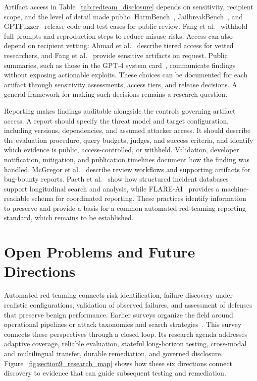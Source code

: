 \documentclass[review]{fcs}
\let\fcsOriginalCite\cite
\renewcommand{\cite}[1]{\allowbreak\fcsOriginalCite{#1}}
\begin{document}
Artifact access in Table~\ref{tab:redteam_disclosure} depends on sensitivity, recipient scope, and the level of detail made public. HarmBench~\cite{mazeika2024harmbench}, JailbreakBench~\cite{chao2024jailbreakbench}, and GPTFuzzer~\cite{yu2023gptfuzzer} release code and test cases for public review. Fang et al.~\cite{fang2024llmagentsautonomouslyhack} withhold full prompts and reproduction steps to reduce misuse risks. Access can also depend on recipient vetting: Ahmad et al.~\cite{ahmad2025externalredteaming} describe tiered access for vetted researchers, and Fang et al.~\cite{fang2024llmagentsautonomouslyhack} provide sensitive artifacts on request. Public summaries, such as those in the GPT-4 system card~\cite{openai2023gpt4systemcard}, communicate findings without exposing actionable exploits. These choices can be documented for each artifact through sensitivity assessments, access tiers, and release decisions. A general framework for making such decisions remains a research question.

Reporting makes findings auditable alongside the controls governing artifact access. A report should specify the threat model and target configuration, including versions, dependencies, and assumed attacker access. It should describe the evaluation procedure, query budgets, judges, and success criteria, and identify which evidence is public, access-controlled, or withheld. Validation, developer notification, mitigation, and publication timelines document how the finding was handled. McGregor et al.~\cite{mcgregor2025toerr} describe review workflows and supporting artifacts for bug-bounty reports. Paeth et al.~\cite{paeth2025lessons} show how structured incident databases support longitudinal search and analysis, while FLARE-AI~\cite{longpre2026flareai} provides a machine-readable schema for coordinated reporting. These practices identify information to preserve and provide a basis for a common automated red-teaming reporting standard, which remains to be established.

\section{Open Problems and Future Directions}
\label{sec:agenda}

Automated red teaming connects risk identification, failure discovery under realistic configurations, validation of observed failures, and assessment of defenses that preserve benign performance. Earlier surveys organize the field around operational pipelines or attack taxonomies and search strategies~\cite{purpura-etal-2025-building,Lin_2025}. This survey connects these perspectives through a closed loop. Its research agenda addresses adaptive coverage, reliable evaluation, stateful long-horizon testing, cross-modal and multilingual transfer, durable remediation, and governed disclosure. Figure~\ref{fig:section9_research_map} shows how these six directions connect discovery to evidence that can guide subsequent testing and remediation.
\end{document}
